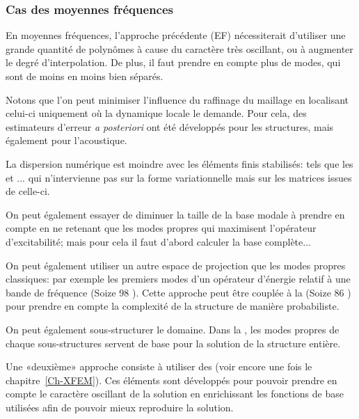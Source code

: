 \medskip
\subsubsection{Cas des moyennes fréquences}

En moyennes fréquences, l'approche précédente (EF) nécessiterait d'utiliser une grande quantité de polynômes à cause du caractère très oscillant, ou à augmenter le degré d'interpolation. De plus, il faut prendre en compte plus de modes, qui sont de moins en moins bien séparés.

\medskip
Notons que l'on peut minimiser l'influence du raffinage du maillage en localisant celui-ci uniquement où la dynamique locale le demande. Pour cela, des estimateurs d'erreur \emph{a posteriori} ont été développés pour les structures, mais également pour l'acoustique.

La dispersion numérique est moindre avec les éléments finis stabilisés: tels que les  et ... qui n'intervienne pas sur la forme variationnelle mais sur les matrices issues de celle-ci.

\medskip
On peut également essayer de diminuer la taille de la base modale à prendre en compte en ne retenant que les modes propres qui maximisent l'opérateur d'excitabilité; mais pour cela il faut d'abord calculer la base complète...

On peut également utiliser un autre espace de projection que les modes propres classiques: par exemple les premiers modes d'un opérateur d'énergie relatif à une bande de fréquence (Soize 98 \cite{bib-Soize98}). Cette approche peut être couplée à la  (Soize 86 \cite{bib-Soize86}) pour prendre en compte la complexité de la structure de manière probabiliste.

\medskip
On peut également sous-structurer le domaine. Dans la , les modes propres de chaque sous-structures servent de base pour la solution de la structure entière.

\bigskip
Une «deuxième» approche consiste à utiliser des  (voir encore une fois le chapitre~\ref{Ch-XFEM}). Ces éléments sont développés pour pouvoir prendre en compte le caractère oscillant de la solution en enrichissant les fonctions de base utilisées afin de pouvoir mieux reproduire la solution.

